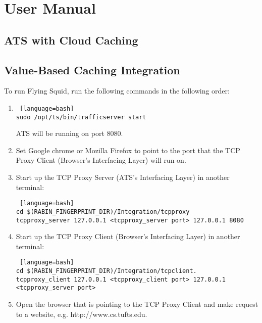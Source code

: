 \section{User Manual}

\subsection{ATS with Cloud Caching}



\subsection{Value-Based Caching Integration}

To run Flying Squid, run the following commands in the following order:

\begin{enumerate}

\item 

\begin{lstlisting} [language=bash] 
sudo /opt/ts/bin/trafficserver start
\end{lstlisting}

ATS will be running on port 8080.

\item 

Set Google chrome or Mozilla Firefox to point to the port that the TCP Proxy Client (Browser's Interfacing Layer) will run on. 

\item 

Start up the TCP Proxy Server (ATS's Interfacing Layer) in another terminal:

\begin{lstlisting} [language=bash] 
cd $(RABIN_FINGERPRINT_DIR)/Integration/tcpproxy
tcpproxy_server 127.0.0.1 <tcpproxy_server port> 127.0.0.1 8080
\end{lstlisting}

\item

Start up the TCP Proxy Client (Browser's Interfacing Layer) in another terminal:

\begin{lstlisting} [language=bash] 
cd $(RABIN_FINGERPRINT_DIR)/Integration/tcpclient.
tcpproxy_client 127.0.0.1 <tcpproxy_client port> 127.0.0.1 <tcpproxy_server port>
\end{lstlisting}

\item

Open the browser that is pointing to the TCP Proxy Client and make request to a website, e.g. http://www.cs.tufts.edu.

\end{enumerate}


